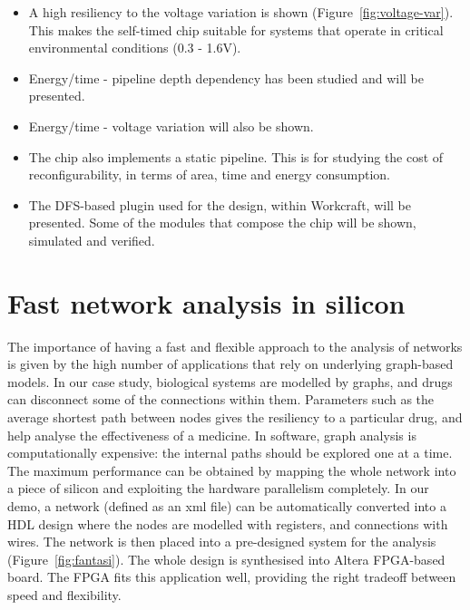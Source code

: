 \documentclass[conference]{IEEEtran}
\begin{document}
\noindent
\begin{itemize}
\item A high resiliency to the voltage variation is shown (Figure~\ref{fig:voltage-var}).
This makes the self-timed chip suitable for systems that operate in critical environmental conditions (0.3 - 1.6V).
\item Energy/time - pipeline depth dependency has been studied and will be presented.
\item Energy/time - voltage variation will also be shown.
\item The chip also implements a static pipeline. This is for studying the
cost of reconfigurability, in terms of area, time and energy consumption.
\item The DFS-based plugin used for the design, within Workcraft, will be presented.
Some of the modules that compose the chip will be shown, simulated and verified.
\end{itemize}

\section*{Fast network analysis in silicon}
The importance of having a fast and flexible approach to the analysis of networks is given by the high number of applications that rely on underlying graph-based models. In our case study, biological systems are modelled by graphs, and drugs can disconnect some of the connections within them. Parameters such as the average shortest path between nodes gives the resiliency to a particular drug, and help analyse the effectiveness of a medicine. In software, graph analysis is computationally expensive: the internal paths should be explored one at a time. %
The maximum performance can be obtained by mapping the whole network into a piece of silicon and exploiting the hardware parallelism completely. In our demo, a network (defined as an xml file) can be automatically converted into a HDL design where the nodes are modelled with registers, and connections with wires. The network is then placed into a pre-designed system for the analysis (Figure~\ref{fig:fantasi}). The whole design is synthesised into Altera FPGA-based board. The FPGA fits this application well, providing the right tradeoff between speed and flexibility.
\end{document}
